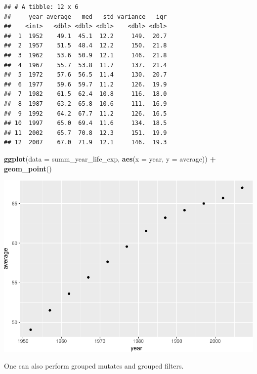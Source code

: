 \documentclass[]{article}
\newenvironment{Shaded}{\begin{snugshade}}{\end{snugshade}}
\newcommand{\KeywordTok}[1]{\textcolor[rgb]{0.13,0.29,0.53}{\textbf{#1}}}
\newcommand{\DataTypeTok}[1]{\textcolor[rgb]{0.13,0.29,0.53}{#1}}
\newcommand{\StringTok}[1]{\textcolor[rgb]{0.31,0.60,0.02}{#1}}
\newcommand{\OperatorTok}[1]{\textcolor[rgb]{0.81,0.36,0.00}{\textbf{#1}}}
\newcommand{\NormalTok}[1]{#1}
\begin{document}
\begin{verbatim}
## # A tibble: 12 x 6
##     year average   med   std variance   iqr
##    <int>   <dbl> <dbl> <dbl>    <dbl> <dbl>
##  1  1952    49.1  45.1  12.2     149.  20.7
##  2  1957    51.5  48.4  12.2     150.  21.8
##  3  1962    53.6  50.9  12.1     146.  21.8
##  4  1967    55.7  53.8  11.7     137.  21.4
##  5  1972    57.6  56.5  11.4     130.  20.7
##  6  1977    59.6  59.7  11.2     126.  19.9
##  7  1982    61.5  62.4  10.8     116.  18.0
##  8  1987    63.2  65.8  10.6     111.  16.9
##  9  1992    64.2  67.7  11.2     126.  16.5
## 10  1997    65.0  69.4  11.6     134.  18.5
## 11  2002    65.7  70.8  12.3     151.  19.9
## 12  2007    67.0  71.9  12.1     146.  19.3
\end{verbatim}

\begin{Shaded}
\begin{Highlighting}[]
\KeywordTok{ggplot}\NormalTok{(}\DataTypeTok{data =}\NormalTok{ summ_year_life_exp, }
       \KeywordTok{aes}\NormalTok{(}\DataTypeTok{x =}\NormalTok{ year, }\DataTypeTok{y =}\NormalTok{ average)) }\OperatorTok{+}\StringTok{ }
\StringTok{  }\KeywordTok{geom_point}\NormalTok{()}
\end{Highlighting}
\end{Shaded}

\includegraphics{Intro_data_wrangling_files/figure-latex/summ_cont-2.pdf}

One can also perform grouped mutates and grouped filters.
\end{document}
